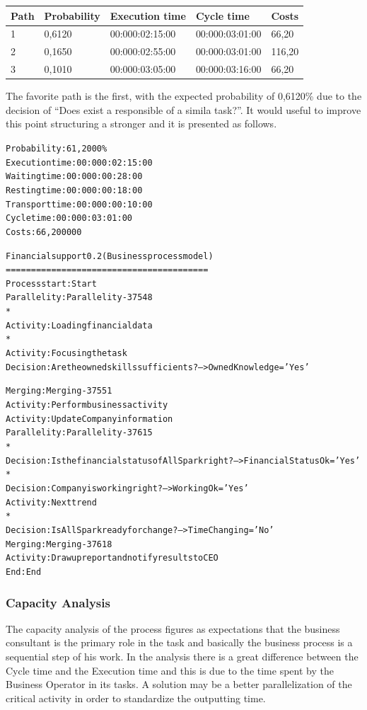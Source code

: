 \begin{table}[ht!]
\ventering
\begin{tabular}{|l|l|l|l|l|}
\hline
Path&Probability&Execution time&Cycle time&Costs\\
\hline
1&0,6120&00:000:02:15:00&00:000:03:01:00&66,20\\
\hline
2&0,1650&00:000:02:55:00&00:000:03:01:00&116,20\\
\hline
3&0,1010&00:000:03:05:00&00:000:03:16:00&66,20\\
\hline
\end{tabular}
\end{table}

The favorite path is the first, with the expected probability of 0,6120\% due to the decision of ``Does exist a responsible of a simila task?''. It would useful to improve this point structuring a stronger  and it is presented as follows.\\

\begin{alltt}
Probability:   61,2000\%
Execution time:  00:000:02:15:00
Waiting time:  00:000:00:28:00
Resting time:  00:000:00:18:00
Transport time:  00:000:00:10:00
Cycle time:  00:000:03:01:00
Costs:  66,200000

Financial support 0.2 (Business process model)
========================================
Process start: Start
Parallelity: Parallelity-37548
    *
    Activity: Loading financial data
    *
    Activity: Focusing the task
    Decision: Are the owned skills sufficients? --> OwnedKnowledge='Yes'

Merging: Merging-37551
Activity: Perform business activity
Activity: Update Company information
Parallelity: Parallelity-37615
    *
    Decision: Is the financial status of AllSpark right? --> FinancialStatusOk='Yes'
    *
    Decision: Company is working right? --> WorkingOk='Yes'
    Activity: Next trend
    *
    Decision: Is AllSpark ready for change? --> TimeChanging='No'
Merging: Merging-37618
Activity: Draw up report and notify results to CEO
End: End
\end{alltt}


\subsubsection{Capacity Analysis}
The capacity analysis of the process figures as expectations that the business consultant is the primary role in the task and basically the business process is a sequential step of his work. In the analysis there is a great difference between the Cycle time and the Execution time and this is due to the time spent by the Business Operator in its tasks. A solution may be a better parallelization of the critical activity in order to standardize the outputting time.

